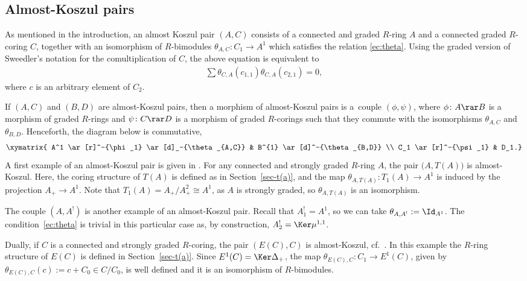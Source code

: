 \subsection{Almost-Koszul pairs} \label{sec:almost}
As mentioned in the introduction, an almost Koszul pair $(A,C)$ consists of a connected and graded $R$-ring $A$ and a connected graded $R$-coring $C$, together with an isomorphism of $R$-bimodules $\theta_{A,C} \colon C_1 \rightarrow A^1$ which satisf\/ies the relation \eqref{ec:theta}. Using the graded version of Sweedler's notation for the comultiplication of $C$, the above equation is equivalent to
\begin{gather} \label{ec:qksz}
	\sum \theta_{C,A}(c_{1,1})\theta_{C,A}(c_{2,1})=0,
\end{gather}
where $c$ is an arbitrary element of $C_2$.

If $(A,C)$ and $(B,D)$ are almost-Koszul pairs, then a morphism of almost-Koszul pairs is a~couple $(\phi,\psi)$, where $\phi\colon A \rar B$ is a morphism of graded $R$-rings and $\psi\colon C \rar D$ is a morphism of graded $R$-corings such that they commute with the isomorphisms $\theta_{A,C}$ and $\theta_{B,D}$. Henceforth, the diagram below is commutative,
\begin{gather*}
 \xymatrix{ A^1 \ar[r]^-{\phi_1} \ar[d]_-{\theta_{A,C}} & B^{1} \ar[d]^-{\theta_{B,D}} \\
C_1 \ar[r]^-{\psi_1} & D_1.}
\end{gather*}
A f\/irst example of an almost-Koszul pair is given in \cite[Proposition 1.8]{jps}. For any connected and strongly graded $R$-ring $A$, the pair $\big(A,T(A)\big)$ is almost-Koszul. Here, the coring structure of $T(A)$ is def\/ined as in Section~\ref{sec-t(a)}, and the map $\theta_{A,T(A)}\colon T_1(A)\to A^1$ is induced by the projection $A_+\to A^1$. Note that $T_1(A)=A_+/A_+^2\cong A^1$, as $A$ is strongly graded, so $\theta_{A,T(A)}$ is an isomorphism.

The couple $(A,A^!)$ is another example of an almost-Koszul pair. Recall that $A^!_1=A^1$, so we can take $\theta_{A,A^!}:=\Id_{A^1}$. The condition~\eqref{ec:theta} is trivial in this particular case as, by construction, $A^!_2=\Ker\mu^{1,1}$.

Dually, if $C$ is a connected and strongly graded $R$-coring, the pair $(E(C),C)$ is almost-Koszul, cf.~\cite[Proposition~1.18]{jps}. In this example the $R$-ring structure of $E(C)$ is def\/ined in Section~\ref{sec-t(a)}. Since $E^1(C)=\Ker\Delta_+$, the map $\theta_{E(C),C}\colon C_1\to E^1(C)$, given by $\theta_{E(C),C}(c):=c+C_0\in C/C_0$, is well def\/ined and it is an isomorphism of $R$-bimodules.

